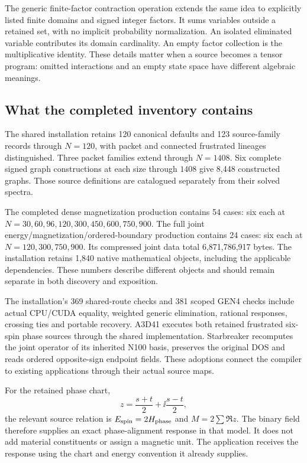 The generic finite-factor contraction operation extends the same idea to explicitly listed finite domains and signed integer factors. It sums variables outside a retained set, with no implicit probability normalization. An isolated eliminated variable contributes its domain cardinality. An empty factor collection is the multiplicative identity. These details matter when a source becomes a tensor program: omitted interactions and an empty state space have different algebraic meanings.

\subsection{What the completed inventory contains}

The shared installation retains 120 canonical defaults and 123 source-family records through $N=120$, with packet and connected frustrated lineages distinguished. Three packet families extend through $N=1408$. Six complete signed graph constructions at each size through $1408$ give 8,448 constructed graphs. Those source definitions are catalogued separately from their solved spectra.

The completed dense magnetization production contains 54 cases: six each at $N=30,60,96,120,300,450,600,750,900$. The full joint energy/magnetization/ordered-boundary production contains 24 cases: six each at $N=120,300,750,900$. Its compressed joint data total 6,871,786,917 bytes. The installation retains 1,840 native mathematical objects, including the applicable dependencies. These numbers describe different objects and should remain separate in both discovery and exposition.

The installation's 369 shared-route checks and 381 scoped GEN4 checks include actual CPU/CUDA equality, weighted generic elimination, rational responses, crossing ties and portable recovery. A3D41 executes both retained frustrated six-spin phase sources through the shared implementation. Starbreaker recomputes the joint operator of its inherited N100 basis, preserves the original DOS and reads ordered opposite-sign endpoint fields. These adoptions connect the compiler to existing applications through their actual source maps.

For the retained phase chart,
\begin{equation}
 z=\frac{s+t}{2}+\ii\frac{s-t}{2},
\end{equation}
the relevant source relation is $E_{\rm spin}=2H_{\rm phase}$ and $M=2\sum\Re z$. The binary field therefore supplies an exact phase-alignment response in that model. It does not add material constituents or assign a magnetic unit. The application receives the response using the chart and energy convention it already supplies.

